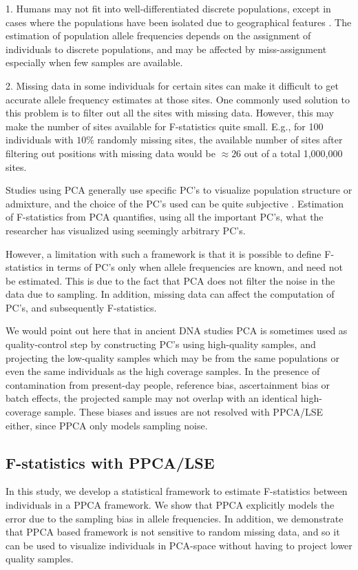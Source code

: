 \documentclass[12pt, letterpaper]{article}
\begin{document}
1. Humans may not fit into well-differentiated discrete populations, except in cases where the populations have been isolated due to geographical features \cite{novembre_genes_2008}. The estimation of population allele frequencies depends on the assignment of individuals to discrete populations, and may be affected by miss-assignment especially when few samples are available. 

2. Missing data in some individuals for certain sites can make it difficult to get accurate allele frequency estimates at those sites. One commonly used solution to this problem is to filter out all the sites with missing data. However, this may make the number of sites available for F-statistics quite small. E.g., for 100 individuals with $10\%$ randomly missing sites, the available number of sites after filtering out positions with missing data would be $\approx26$ out of a total 1,000,000 sites. 

Studies using PCA generally use specific PC's to visualize population structure or admixture, and the choice of the PC's used can be quite subjective \cite{elhaik_principal_2022}. Estimation of F-statistics from PCA quantifies, using all the important PC's, what the researcher has visualized using seemingly arbitrary PC's.

However, a limitation with such a framework is that it is possible to define F-statistics in terms of PC's only when allele frequencies are known, and need not be estimated. This is due to the fact that PCA does not filter the noise in the data due to sampling. In addition, missing data can affect the computation of PC's, and subsequently F-statistics.


We would point out here that in ancient DNA studies PCA is sometimes used as quality-control step by constructing PC's using high-quality samples, and projecting the low-quality samples which may be from the same populations or even the same individuals as the high coverage samples. In the presence of contamination from present-day people, reference bias, ascertainment bias or batch effects, the projected sample may not overlap with an identical high-coverage sample. These biases and issues are not resolved with PPCA/LSE either, since PPCA only models sampling noise. 


\subsection{F-statistics with PPCA/LSE}
In this study, we develop a statistical framework to estimate F-statistics between individuals in a PPCA framework. We show that PPCA explicitly models the error due to the sampling bias in allele frequencies. In addition, we demonstrate that PPCA based framework is not sensitive to random missing data, and so it can be used to visualize individuals in PCA-space without having to project lower quality samples.
\end{document}
